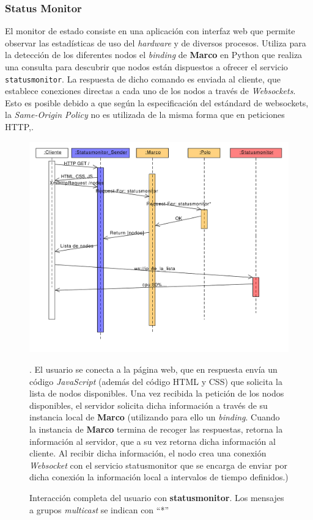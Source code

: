 \subsubsection{Status Monitor}

El monitor de estado consiste en una aplicación con interfaz web que permite observar las estadísticas de uso del \textit{hardware} y de diversos procesos. Utiliza para la detección de los diferentes nodos el \textit{binding} de \textbf{Marco} en Python que realiza una consulta para descubrir que nodos están dispuestos a ofrecer el servicio \texttt{statusmonitor}. La respuesta de dicho comando es enviada al cliente, que establece conexiones directas a cada uno de los nodos a través de \textit{Websockets}\citationneeded. Esto es posible debido a que según la especificación del estándard de websockets, la \textit{Same-Origin Policy}\cite{rfc6455} no es utilizada de la misma forma que en peticiones HTTP,\cite{rfc6454}.

\begin{figure}[H]
\centering
\includegraphics[width=\textwidth]{Diagrams/Sequence/statusmonitor}
\caption[Interacción completa del usuario con \textbf{Statusmonitor}]{Interacción completa del usuario con \textbf{statusmonitor}. Los mensajes a grupos \textit{multicast} se indican con ``*''}. El usuario se conecta a la página web, que en respuesta envía un código \textit{JavaScript} (además del código HTML y CSS) que solicita la lista de nodos disponibles. Una vez recibida la petición de los nodos disponibles, el servidor solicita dicha información a través de su instancia local de \textbf{Marco} (utilizando para ello un \textit{binding}. Cuando la instancia de \textbf{Marco} termina de recoger las respuestas, retorna la información al servidor, que a su vez retorna dicha información al cliente. Al recibir dicha información, el nodo crea una conexión \textit{Websocket} con el servicio statusmonitor que se encarga de enviar por dicha conexión la información local a intervalos de tiempo definidos.)
\label{fig:secuencia_statusmonitor}
\end{figure}

